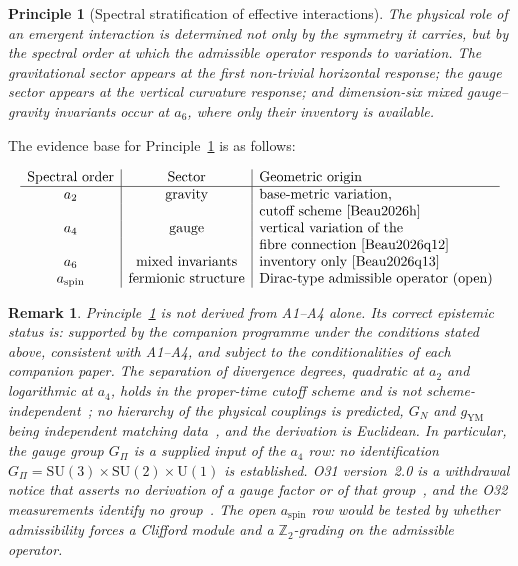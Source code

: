 \documentclass[11pt,a4paper]{article}
\newtheorem{remark}[theorem]{Remark}
\newtheorem{principle}[theorem]{Principle}
\begin{document}
    \begin{principle}[Spectral stratification of effective interactions]
      \label{prin:stratification}
      The physical role of an emergent interaction is determined not only by the
      symmetry it carries, but by the spectral order at which the admissible operator
      responds to variation.
      The gravitational sector appears at the first non-trivial horizontal response;
      the gauge sector appears at the vertical curvature response;
      and dimension-six mixed gauge--gravity invariants occur at $a_6$, where only their inventory is
      available.
    \end{principle}

    The evidence base for Principle~\ref{prin:stratification} is as follows:

    \[
      \begin{array}{c|c|l}
        \text{Spectral order} & \text{Sector} & \text{Geometric origin} \\
        \hline
        a_2 & \text{gravity}
        & \text{base-metric variation,} \\
        & & \text{cutoff scheme}~\text{\cite{Beau2026h}} \\
        a_4 & \text{gauge}
        & \text{vertical variation of the} \\
        & & \text{fibre connection}~\text{\cite{Beau2026q12}} \\
        a_6 & \text{mixed invariants}
        & \text{inventory only}~\text{\cite{Beau2026q13}} \\
        a_{\mathrm{spin}} & \text{fermionic structure}
        & \text{Dirac-type admissible operator (open)} \\
      \end{array}
    \]

    \begin{remark}
      \label{rem:stratification-status}
      Principle~\ref{prin:stratification} is \emph{not} derived from A1--A4 alone.
      Its correct epistemic status is: supported by the companion programme under the conditions stated
      above, consistent with A1--A4, and subject to the conditionalities of each companion paper.
      The separation of divergence degrees, quadratic at $a_2$ and logarithmic at $a_4$, holds in the
      proper-time cutoff scheme and is not scheme-independent~\cite{Beau2026h,Beau2026q12}; no hierarchy of
      the physical couplings is predicted, $G_N$ and $g_{\mathrm{YM}}$ being independent matching
      data~\cite{Beau2026q13}, and the derivation is Euclidean.
      In particular, the gauge group $G_\Pi$ is a supplied input of the $a_4$ row: no identification
      $G_\Pi = \mathrm{SU}(3)\times\mathrm{SU}(2)\times\mathrm{U}(1)$ is established.
      O31 version~2.0 is a withdrawal notice that asserts no derivation of a gauge factor or of that
      group~\cite{Beau2026a35}, and the O32 measurements identify no group~\cite{Beau2026a36}.
      The open $a_{\mathrm{spin}}$ row would be tested by whether admissibility forces a Clifford module
      and a $\mathbb{Z}_2$-grading on the admissible operator.
    \end{remark}
\end{document}
